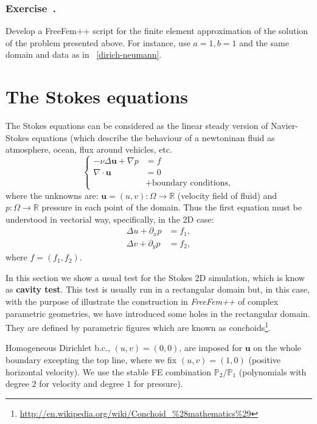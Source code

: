 \documentclass[12pt]{article}
\newcommand{\FF}{\textit{FreeFem++}\xspace}
\renewcommand{\P}{\mathbb{P}_}
\newcommand{\R}{{\mathbb R}}
\newcounter{exercise}
\newenvironment{exercise}{%
  \stepcounter{exercise}
  \subsubsection*{Exercise~\theexercise.}}
{}
\begin{document}
\begin{exercise}
  Develop a FreeFem++ script for the finite element approximation of
  the solution of the problem presented above. For instance, use
  $a=1, b=1$ and the same domain and data as in
  \lstlistingname~\ref{dirich-neumann}.
\end{exercise}

\section{The Stokes equations}
\label{sec:stokes}

The Stokes equations can be considered as the linear steady version of
Navier-Stokes equations (which describe the behaviour of a newtoninan
fluid as atmosphere, ocean, flux around vehicles, etc.
\begin{equation*}
  \left\{
  \begin{aligned}
    -\nu\Delta \mathbf{u}+ \nabla p &= f
    \\
    \nabla\cdot \mathbf{u} & = 0
    \\ & + \text{boundary conditions},
  \end{aligned}
  \right.
\end{equation*}
where the unknowns are: $\mathbf{u}=(u,v):\Omega\to\R$ (velocity field
of fluid) and $p:\Omega\to\R$ pressure in each point of the domain.
Thus the first equation must be understood in vectorial way,
specifically, in the 2D case:
\begin{align*}
  \Delta u + \partial_x p &= f_1, \\
  \Delta v + \partial_y p &= f_2,
\end{align*}
where  $f=(f_1,f_2)$.

In this section we show a usual test for the Stokes 2D simulation,
which is know as \textbf{cavity test}. This test is usually run in a
rectangular domain but, in this case, with the purpose of illustrate
the construction in \FF of complex parametric geometries, we have
introduced some holes in the rectangular domain. They are defined by
parametric figures which are known as
conchoids\footnote{\url{http://en.wikipedia.org/wiki/Conchoid_\%28mathematics\%29}}.

Homogeneous Dirichlet b.c., $(u,v)=(0,0)$, are imposed for
$\mathbf{u}$ on the whole boundary excepting the top line, where we
fix $(u,v)=(1,0)$  (positive horizontal velocity). We use the stable
FE combination  $\P2/\P1$ (polynomials with degree $2$ for velocity
and degree $1$ for pressure).
\end{document}

